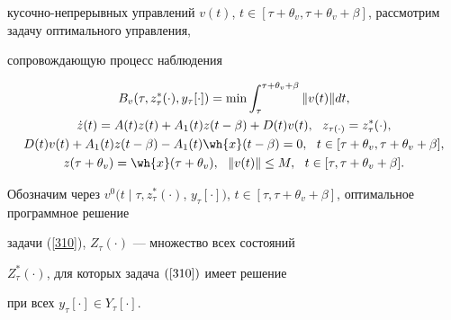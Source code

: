 кусочно-непрерывных управлений $v(t)$, $t \in [\tau+\theta_v,


\tau+\theta_v+\beta]$, рассмотрим задачу оптимального управления,


сопровождающую процесс наблюдения


\begin{gather}


B_v(\tau,z_\tau^*(\cdot),y_\tau[\cdot])=\min


\int_{\tau}^{\tau+\theta_v+\beta}\|v(t)\|dt, \notag \\


%


\label{310}


\Dot


z(t)=A(t)z(t)+A_1(t)z(t-\beta)+D(t)v(t),


\ \ z_{\tau(\cdot)}=z_{\tau}^*(\cdot),\\


%


D(t)v(t)+A_1(t)z(t-\beta)-A_1(t)\wh{x}(t-\beta)=0,\ \ t \in


[\tau+\theta_v,\tau+\theta_v+\beta], \notag \\


%


z(\tau+\theta_v)=\wh{x}(\tau+\theta_v),\ \ \|v(t)\| \le M,\ \ t \in


[\tau, \tau+\theta_v+\beta].\notag


\end{gather}





Обозначим через $v^0(t\mid\tau,z_{\tau}^*(\cdot)$, $y_\tau[\cdot])$, $t \in


[\tau,\tau+\theta_v+\beta]$, оптимальное программное решение


задачи (\ref{310}), $Z_\tau(\cdot)$ --- множество всех состояний


$Z_{\tau}^*(\cdot)$, для которых задача $(\ref{310})$ имеет решение


при всех $y_\tau[\cdot] \in Y_{\tau}[\cdot]$.





